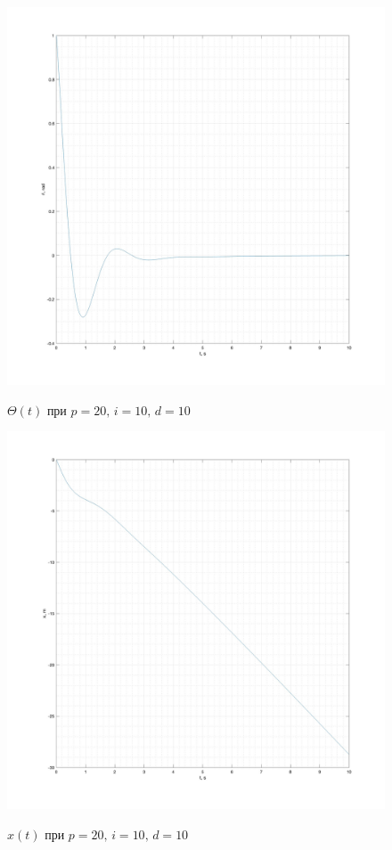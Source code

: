 \documentclass[a5paper, 10pt]{article}
\theoremstyle{definition}
\theoremstyle{plain}
\theoremstyle{remark}
\begin{document}
\begin{figure}[!h]
		{\includegraphics[width=1\linewidth]{"./graphics/tet_20_10_10.jpg"}}
	           \caption{$\Theta (t)$ при $p = 20, \, i = 10, \, d = 10$}
\end{figure}
\begin{figure}[!h]
		{\includegraphics[width=1\linewidth]{"./graphics/x_20_10_10.jpg"}}
	           \caption{$x(t)$  при $p = 20, \, i = 10, \, d = 10$}
\end{figure}
\end{document}
